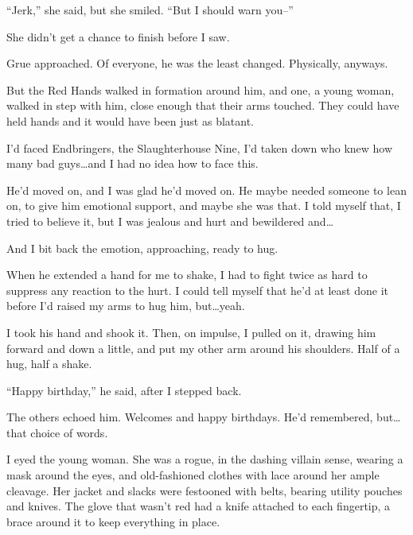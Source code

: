 ``Jerk,'' she said, but she smiled.  ``But I should warn you--''



She didn't get a chance to finish before I saw.



Grue approached.  Of everyone, he was the least changed.  Physically, anyways.



But the Red Hands walked in formation around him, and one, a young woman, walked in step with him, close enough that their arms touched.  They could have held hands and it would have been just as blatant.



I'd faced Endbringers, the Slaughterhouse Nine, I'd taken down who knew how many bad guys\ldots and I had no idea how to face this.



He'd moved on, and I was glad he'd moved on.  He maybe needed someone to lean on, to give him emotional support, and maybe she was that.  I told myself that, I tried to believe it, but I was jealous and hurt and bewildered and\ldots



And I bit back the emotion, approaching, ready to hug.



When he extended a hand for me to shake, I had to fight twice as hard to suppress any reaction to the hurt.  I could tell myself that he'd at least done it before I'd raised my arms to hug him, but\ldots yeah.



I took his hand and shook it.  Then, on impulse, I pulled on it, drawing him forward and down a little, and put my other arm around his shoulders.  Half of a hug, half a shake.



``Happy birthday,'' he said, after I stepped back.



The others echoed him.  Welcomes and happy birthdays.  He'd remembered, but\ldots that choice of words.



I eyed the young woman.  She was a rogue, in the dashing villain sense, wearing a mask around the eyes, and old-fashioned clothes with lace around her ample cleavage.  Her jacket and slacks were festooned with belts, bearing utility pouches and knives.  The glove that wasn't red had a knife attached to each fingertip, a brace around it to keep everything in place.



